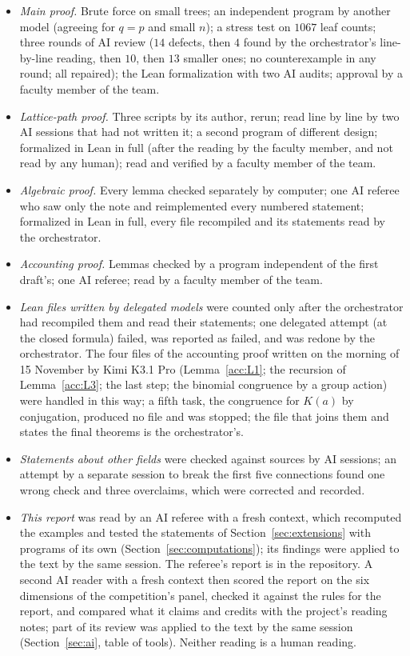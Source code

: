 \documentclass[11pt]{article}
\theoremstyle{definition}
\theoremstyle{remark}
\numberwithin{equation}{section}
\numberwithin{figure}{section}
\begin{document}
\begin{itemize}[itemsep=1pt]
\item \emph{Main proof.} Brute force on small trees; an independent program by another model (agreeing for
 $q=p$ and small $n$); a stress test on $1067$ leaf counts; three rounds of AI review ($14$ defects, then $4$
 found by the orchestrator's line-by-line reading, then $10$, then $13$ smaller ones; no counterexample in
 any round; all repaired); the Lean formalization with two AI audits; approval by a faculty member of the
 team.
\item \emph{Lattice-path proof.} Three scripts by its author, rerun; read line by line by two AI sessions
 that had not written it; a second program of different design; formalized in Lean in full (after the
 reading by the faculty member, and not read by any human); read and verified by a faculty member of the team.
\item \emph{Algebraic proof.} Every lemma checked separately by computer; one AI referee who saw only the
 note and reimplemented every numbered statement; formalized in Lean in full, every file recompiled and its
 statements read by the orchestrator.
\item \emph{Accounting proof.} Lemmas checked by a program independent of the first draft's; one AI referee;
 read by a faculty member of the team.
\item \emph{Lean files written by delegated models} were counted only after the orchestrator had recompiled
 them and read their statements; one delegated attempt (at the closed formula) failed, was reported as
 failed, and was redone by the orchestrator. The four files of the accounting proof written on the morning
 of 15 November by Kimi K3.1 Pro (Lemma~\ref{acc:L1}; the recursion of Lemma~\ref{acc:L3}; the last step; the
 binomial congruence by a group action) were handled in this way; a fifth task, the congruence for $K(a)$ by
 conjugation, produced no file and was stopped; the file that joins them and states the final theorems is the orchestrator's.
\item \emph{Statements about other fields} were checked against sources by AI sessions; an attempt by a
 separate session to break the first five connections found one wrong check and three overclaims, which were
 corrected and recorded.
\item \emph{This report} was read by an AI referee with a fresh context, which recomputed the examples and
 tested the statements of Section~\ref{sec:extensions} with programs of its own
 (Section~\ref{sec:computations}); its findings were applied to the text by the same session. The referee's
 report is in the repository. A second AI reader with a fresh context then scored the report on the six
 dimensions of the competition's panel, checked it against the rules for the report, and compared what it
 claims and credits with the project's reading notes; part of its review was applied to the text by the same
 session (Section~\ref{sec:ai}, table of tools). Neither reading is a human reading.
\end{itemize}
\end{document}
